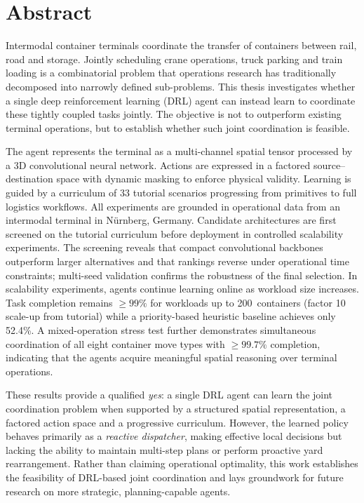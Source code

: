 \chapter*{Abstract}

Intermodal container terminals coordinate the transfer of containers between
rail, road and storage. Jointly scheduling crane operations, truck parking and
train loading is a combinatorial problem that operations research has
traditionally decomposed into narrowly defined sub-problems. This thesis
investigates whether a single deep reinforcement learning (DRL) agent can
instead learn to coordinate these tightly coupled tasks jointly. The objective
is not to outperform existing terminal operations, but to establish whether
such joint coordination is feasible.

The agent represents the terminal as a multi-channel spatial tensor processed
by a 3D convolutional neural network. Actions are expressed in a factored
source--destination space with dynamic masking to enforce physical validity.
Learning is guided by a curriculum of 33 tutorial scenarios progressing from
primitives to full logistics workflows. All experiments are grounded in
operational data from an intermodal terminal in N\"urnberg, Germany.
Candidate architectures are first screened on the tutorial curriculum before
deployment in controlled scalability experiments. The screening reveals that
compact convolutional backbones outperform larger alternatives and that
rankings reverse under operational time constraints; multi-seed validation
confirms the robustness of the final selection. In scalability experiments,
agents continue learning online as workload size increases. Task completion remains $\geq 99\%$ for workloads up to
200~containers (factor 10 scale-up from tutorial) while a priority-based heuristic 
baseline achieves only 52.4\%. A mixed-operation stress test further demonstrates 
simultaneous coordination of all eight container move types with $\geq 99.7\%$ completion, 
indicating that the agents acquire meaningful spatial reasoning over terminal operations.

These results provide a qualified \emph{yes}: a single DRL agent can learn the
joint coordination problem when supported by a structured spatial
representation, a factored action space and a progressive curriculum.
However, the learned policy behaves primarily as a \emph{reactive dispatcher},
making effective local decisions but lacking the ability to maintain
multi-step plans or perform proactive yard rearrangement. Rather than claiming
operational optimality, this work establishes the feasibility of DRL-based
joint coordination and lays groundwork for future research on more strategic,
planning-capable agents.
